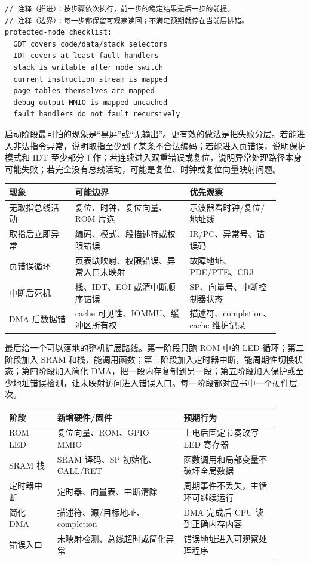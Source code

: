 \begin{lstlisting}
// 注释（推进）：按步骤依次执行，前一步的稳定结果是后一步的前提。
// 注释（边界）：每一步都保留可观察读回；不满足预期就停在当前层排错。
protected-mode checklist:
  GDT covers code/data/stack selectors
  IDT covers at least fault handlers
  stack is writable after mode switch
  current instruction stream is mapped
  page tables themselves are mapped
  debug output MMIO is mapped uncached
  fault handlers do not fault recursively
\end{lstlisting}

启动阶段最可怕的现象是“黑屏”或“无输出”。更有效的做法是把失败分层。若能进入非法指令异常，说明取指至少到了某条不合法编码；若能进入页错误，说明保护模式和 IDT 至少部分工作；若连续进入双重错误或复位，说明异常处理路径本身可能失败；若完全没有总线活动，可能是复位、时钟或复位向量映射问题。

\begin{longtable}{L{0.22\linewidth}L{0.38\linewidth}L{0.3\linewidth}}
\toprule
现象 & 可能边界 & 优先观察 \\
\midrule
无取指总线活动 & 复位、时钟、复位向量、ROM 片选 & 示波器看时钟/复位/地址线 \\\tablerowrule
取指后立即异常 & 编码、模式、段描述符或权限错误 & IR/PC、异常号、错误码 \\\tablerowrule
页错误循环 & 页表缺映射、权限错误、异常入口未映射 & 故障地址、PDE/PTE、CR3 \\\tablerowrule
中断后死机 & 栈、IDT、EOI 或清中断顺序错误 & SP、向量号、中断控制器状态 \\\tablerowrule
DMA 后数据错 & cache 可见性、IOMMU、缓冲区所有权 & 描述符、completion、cache 维护记录 \\
\bottomrule
\end{longtable}

最后给一个可以落地的整机扩展路线。第一阶段只跑 ROM 中的 LED 循环；第二阶段加入 SRAM 和栈，能调用函数；第三阶段加入定时器中断，能周期性切换状态；第四阶段加入简化 DMA，把一段内存复制到另一段；第五阶段加入保护或至少地址错误检测，让未映射访问进入错误入口。每一阶段都对应书中一个硬件层次。

\begin{longtable}{L{0.16\linewidth}L{0.42\linewidth}L{0.32\linewidth}}
\toprule
阶段 & 新增硬件/固件 & 预期行为 \\
\midrule
ROM LED & 复位向量、ROM、GPIO MMIO & 上电后固定节奏改写 LED 寄存器 \\\tablerowrule
SRAM 栈 & SRAM 译码、SP 初始化、CALL/RET & 函数调用和局部变量不破坏全局数据 \\\tablerowrule
定时器中断 & 定时器、向量表、中断清除 & 周期事件不丢失，主循环可继续运行 \\\tablerowrule
简化 DMA & 描述符、源/目标地址、completion & DMA 完成后 CPU 读到正确内存内容 \\\tablerowrule
错误入口 & 未映射检测、总线超时或简化异常 & 错误地址进入可观察处理程序 \\
\bottomrule
\end{longtable}

